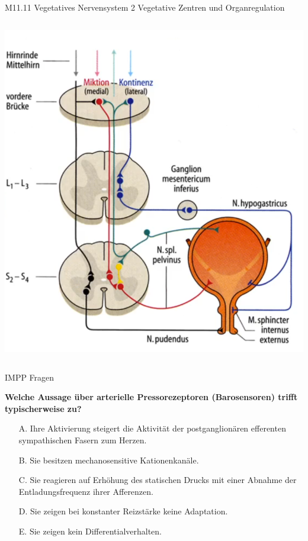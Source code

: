 \documentclass{beamer}
\begin{document}
\begin{frame}{M11.11 Vegetatives Nervensystem 2 Vegetative Zentren und Organregulation}
\begin{columns}[c]
\begin{column}{5cm}
\begin{center}
\includegraphics[width=\textwidth]{miktion.png}    
\end{center}



\end{column}



\end{columns}




\end{frame}


\begin{frame}{IMPP Fragen}


\textbf{Welche Aussage über arterielle Pressorezeptoren (Barosensoren) trifft typischerweise zu?} \\[0.2 cm]

\begin{itemize}
\item[A.] Ihre Aktivierung steigert die Aktivität der postganglionären efferenten sympathischen Fasern zum Herzen.
\item[B.] Sie besitzen mechanosensitive Kationenkanäle. %
\item[C.] Sie reagieren auf Erhöhung des statischen Drucks mit einer Abnahme der Entladungsfrequenz ihrer Afferenzen.
\item[D.] Sie zeigen bei konstanter Reizstärke keine Adaptation.
\item[E.] Sie zeigen kein Differentialverhalten.

\end{itemize}


\end{frame}
\end{document}
